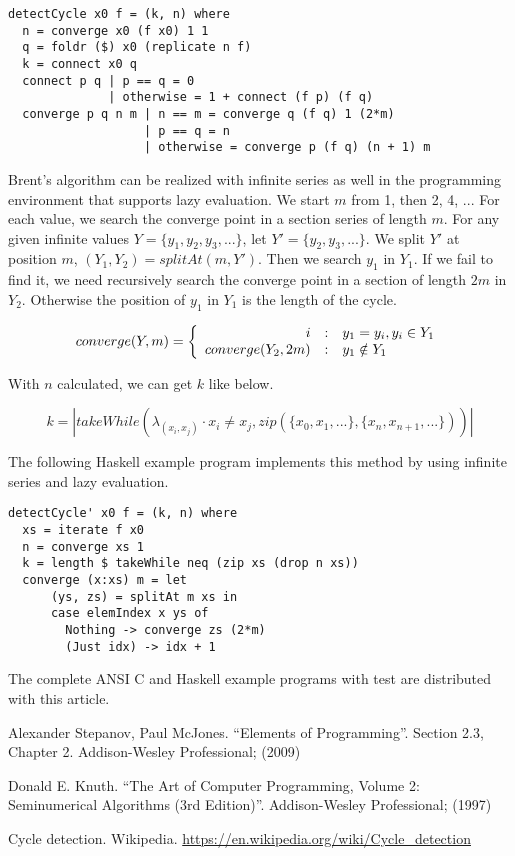 \documentclass{article}
\begin{document}
\lstset{language=Haskell}
\begin{lstlisting}
detectCycle x0 f = (k, n) where
  n = converge x0 (f x0) 1 1
  q = foldr ($) x0 (replicate n f)
  k = connect x0 q
  connect p q | p == q = 0
              | otherwise = 1 + connect (f p) (f q)
  converge p q n m | n == m = converge q (f q) 1 (2*m)
                   | p == q = n
                   | otherwise = converge p (f q) (n + 1) m
\end{lstlisting}

Brent's algorithm can be realized with infinite series as well in the programming environment that supports
lazy evaluation. We start $m$ from 1, then 2, 4, ... For each value, we search the converge point in
a section series of length $m$. For any given infinite values $Y = \{y_1, y_2, y_3, ...\}$, let
$Y' = \{y_2, y_3, ...\}$. We split $Y'$ at position $m$,
$(Y_1, Y_2) = splitAt(m, Y')$. Then we search $y_1$ in $Y_1$. If we fail to find it, we need
recursively search the converge point in a section of length $2m$ in $Y_2$. Otherwise the
position of $y_1$ in $Y_1$ is the length of the cycle.

\begin{equation}
converge(Y, m) = \left \{
  \begin{array}
  {r@{\quad:\quad}l}
  i & y_1 = y_i, y_i \in Y_1 \\
  converge(Y_2, 2m) & y_1 \notin Y_1
  \end{array}
\right.
\end{equation}

With $n$ calculated, we can get $k$ like below.

\begin{equation}
k = |takeWhile(\lambda_{(x_i, x_j)} \cdot x_i \neq x_j, zip(\{x_0, x_1, ... \}, \{x_{n}, x_{n+1}, ...\}))|
\end{equation}

The following Haskell example program implements this method by using infinite series and lazy evaluation.

\lstset{language=Haskell}
\begin{lstlisting}
detectCycle' x0 f = (k, n) where
  xs = iterate f x0
  n = converge xs 1
  k = length $ takeWhile neq (zip xs (drop n xs))
  converge (x:xs) m = let
      (ys, zs) = splitAt m xs in
      case elemIndex x ys of
        Nothing -> converge zs (2*m)
        (Just idx) -> idx + 1
\end{lstlisting}

The complete ANSI C and Haskell example programs with test are distributed with this article.

\begin{thebibliography}{99}

Alexander Stepanov, Paul McJones. ``Elements of Programming''. Section 2.3, Chapter 2. Addison-Wesley Professional; (2009)

Donald E. Knuth. ``The Art of Computer Programming, Volume 2: Seminumerical Algorithms (3rd Edition)''. Addison-Wesley Professional; (1997)

Cycle detection. Wikipedia. \url{https://en.wikipedia.org/wiki/Cycle_detection}

\end{thebibliography}
\end{document}
